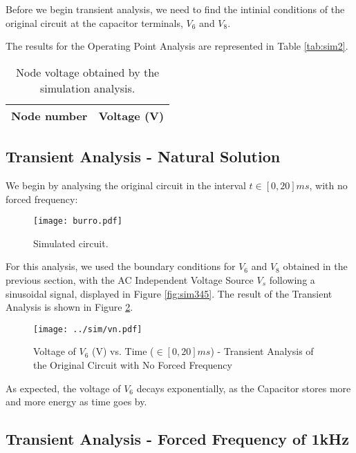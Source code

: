 Before we begin transient analysis, we need to find the intinial conditions of the original circuit at the capacitor terminals, $V_6$ and $V_8$.
\par
The results for the Operating Point Analysis are represented in Table \ref{tab:sim2}.

\begin{table}[H]
  \centering
  \begin{tabular}{|l|r|}
    \hline
    {\bf Node number} & {\bf Voltage (V)} \\ \hline
    
  \end{tabular}
  \caption{Node voltage obtained by the simulation analysis.}
  \label{tab:sim_op_V}
\end{table}

\subsection{Transient Analysis - Natural Solution}
\label{subsec:trans_NS}

We begin by  analysing the original circuit in the interval $t \in [0, 20]ms$, with no forced frequency:

\begin{figure}[H] \centering
\texttt{[image: burro.pdf]}
\caption{Simulated circuit.}
\label{fig:sim_NS}
\end{figure}

For this analysis, we used the boundary conditions for $V_6$ and $V_8$ obtained in the previous section, with the AC Independent Voltage Source $V_s$ following a sinusoidal signal, displayed in Figure \ref{fig:sim345}. The result of the Transient Analysis is shown in Figure \ref{fig:sim-graph3}.

\begin{figure}[H] \centering
\texttt{[image: ../sim/vn.pdf]}
\caption{Voltage of $V_6$ (V) vs. Time ($\in [0, 20]ms$) - Transient Analysis of the Original Circuit with No Forced Frequency}
\label{fig:sim-graph3}
\end{figure}

As expected, the voltage of $V_6$ decays exponentially, as the Capacitor stores more and more energy as time goes by.

\subsection{Transient Analysis - Forced Frequency of 1kHz}
\label{subsec:trans_FS}

